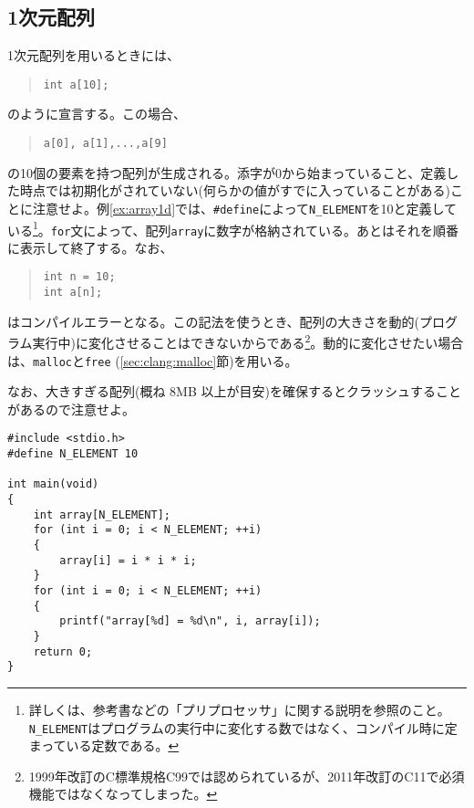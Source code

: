 \subsection{1次元配列}
1次元配列を用いるときには、
\begin{quote}
    \begin{verbatim}
int a[10];
\end{verbatim}
\end{quote}
のように宣言する。この場合、
\begin{quote}
    \begin{verbatim}
a[0], a[1],...,a[9]
\end{verbatim}
\end{quote}
の10個の要素を持つ配列が生成される。添字が0から始まっていること、定義した時点では初期化がされていない(何らかの値がすでに入っていることがある)ことに注意せよ。例\ref{ex:array1d}では、\texttt{\#define}によって\texttt{N\_ELEMENT}を10と定義している\footnote{詳しくは、参考書などの「プリプロセッサ」に関する説明を参照のこと。\texttt{N\_ELEMENT}はプログラムの実行中に変化する数ではなく、コンパイル時に定まっている定数である。}。\texttt{for}文によって、配列\texttt{array}に数字が格納されている。あとはそれを順番に表示して終了する。なお、
\begin{quote}
    \begin{verbatim}
int n = 10;
int a[n];
\end{verbatim}
\end{quote}
はコンパイルエラーとなる。この記法を使うとき、配列の大きさを動的(プログラム実行中)に変化させることはできないからである\footnote{1999年改訂のC標準規格C99では認められているが、2011年改訂のC11で必須機能ではなくなってしまった。}。動的に変化させたい場合は、\texttt{malloc}と\texttt{free} (\ref{sec:clang:malloc}節)を用いる。

なお、大きすぎる配列(概ね 8MB 以上が目安)を確保するとクラッシュすることがあるので注意せよ。
\begin{reidai}\label{ex:array1d}
    \begin{verbatim}
#include <stdio.h>
#define N_ELEMENT 10

int main(void)
{
    int array[N_ELEMENT];
    for (int i = 0; i < N_ELEMENT; ++i)
    {
        array[i] = i * i * i;
    }
    for (int i = 0; i < N_ELEMENT; ++i)
    {
        printf("array[%d] = %d\n", i, array[i]);
    }
    return 0;
}
\end{verbatim}
\end{reidai}

